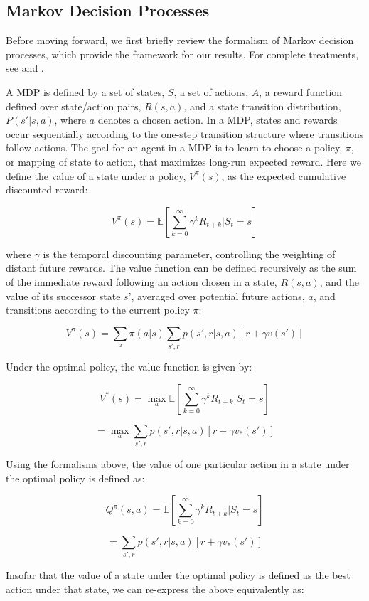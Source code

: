 \documentclass[11pt]{article} %
\begin{document}
\subsection{Markov Decision Processes}

Before moving forward, we first briefly review the formalism of Markov decision processes, which provide the framework for our results. For complete treatments, see \cite{SuttonBarto1998, SuttonBarto2018} and \cite{bertsekas2005}.

A MDP is defined by a set of states, $S$, a set of actions, $A$, a reward function defined over state/action pairs, $R(s,a)$, and a state transition distribution, $P(s'|s,a)$, where $a$ denotes a chosen action. In a MDP, states and rewards occur sequentially according to the one-step transition structure where transitions follow actions. The goal for an agent in a MDP is to learn to choose a policy, $\pi$, or mapping of state to action, that maximizes long-run expected reward. Here we define the value of a state under a policy, $V^\pi(s)$, as the expected cumulative discounted reward:

$$ V^\pi(s) = \mathbb{E} \left[ \sum^{\infty}_{k=0} \gamma^k R_{t+k} | S_t = s \right] $$

where $\gamma$ is the temporal discounting parameter, controlling the weighting of distant future rewards. The value function can be defined recursively as the sum of the immediate reward following an action chosen in a state, $R(s, a)$, and the value of its successor state $s’$, averaged over potential future actions, $a$, and transitions according to the current policy $\pi$:

$$ V^\pi(s) = \sum_a \pi(a|s) \sum_{s',r}p(s',r|s,a) \left[ r + \gamma v(s') \right] $$

Under the optimal policy, the value function is given by:

$$ V^*(s) = \max_a \mathbb{E} \left[ \sum^{\infty}_{k=0} \gamma^k R_{t+k} | S_t = s \right] $$

$$ = \max_a \sum_{s',r}p(s',r|s,a) \left[ r + \gamma v_*(s') \right] $$

Using the formalisms above, the value of one particular action in a state under the optimal policy is defined as:

$$ Q^\pi(s,a) = \mathbb{E} \left[ \sum^{\infty}_{k=0} \gamma^k R_{t+k} | S_t = s \right] $$

$$ = \sum_{s',r}p(s',r|s,a) \left[ r + \gamma v_*(s') \right] $$

Insofar that the value of a state under the optimal policy is defined as the best action under that state, we can re-express the above equivalently as:
\end{document}
